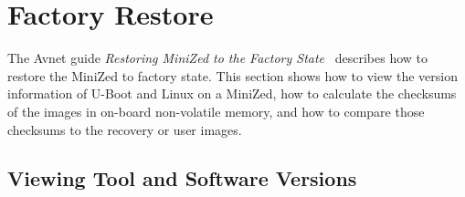 \section{Factory Restore}
\label{sec:factory_restore}

The Avnet guide \emph{Restoring MiniZed to the Factory State}~\cite{Avnet_MiniZed_Restore_2018}
describes how to restore the MiniZed to factory state. This section
shows how to view the version information of U-Boot and Linux on a MiniZed,
how to calculate the checksums of the images in on-board non-volatile memory,
and how to compare those checksums to the recovery or user images.

\subsection{Viewing Tool and Software Versions}
\label{sec:restore_view_versions}

